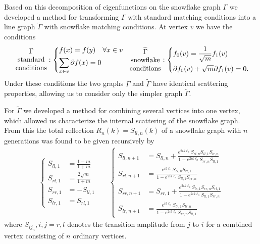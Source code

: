 Based on this decomposition of eigenfunctions on the snowflake graph $\Gamma$ we developed a  method for transforming $\Gamma$ with standard matching conditions into a line graph $\widetilde{\Gamma}$ with snowflake matching conditions. At vertex $v$ we have the conditions
\begin{align*}
  \!\begin{array}{c}
    \Gamma \\
    \text{standard} \\
    \text{conditions}
  \end{array}\!\!\!:
  \begin{dcases}
    f(x) = f(y) \quad \forall x \in v \\
    \sum_{x\in v}  \partial f(x) = 0
  \end{dcases}
  &&
  \!\!\!\!\begin{array}{c}
    \widetilde{\Gamma} \\
    \text{snowflake} \\
    \text{conditions}
  \end{array}\!\!\!:
  \begin{dcases}
    f_0(v) = \frac{1}{\sqrt{m}} f_1(v) \\
    \partial f_0(v) + \sqrt{m} \partial f_1(v) = 0.
  \end{dcases}
\end{align*}
Under these conditions the two graphs $\Gamma$ and $\widetilde{\Gamma}$ have identical scattering properties, allowing us to consider only the simpler graph $\widetilde{\Gamma}$.

For $\widetilde{\Gamma}$ we developed a method for combining several vertices into one vertex, which allowed us characterize the internal scattering of the snowflake graph. From this the total reflection $R_n(k) = S_{ll,n}(k)$ of a snowflake graph with $n$ generations was found to be given recursively by
\begin{align*}
  \left\lbrace\!
  \begin{aligned}
    S_{ll,1} &= \frac{1-m}{1+m} \\
    S_{rl,1} &= \frac{2\sqrt{m}}{1+m} \\
    S_{rr,1} &= -S_{ll,1} \\
    S_{lr,1} &= S_{rl,1}
  \end{aligned}\right.
  &&
  \left\lbrace\!
  \begin{aligned}
    S_{ll,n+1} &= S_{ll,n} + \frac{e^{2ik\ell_n} S_{rl,n} S_{ll,1} S_{lr,n}}{1 - e^{2ik\ell_n} S_{rr,n} S_{ll,1}} \\
    S_{rl,n+1} &= \frac{e^{ik\ell_n} S_{rl,n} S_{rl,1}}{1 - e^{2ik\ell_n} S_{ll,1} S_{rr,n}} \\
    S_{rr,n+1} &= S_{rr,1} + \frac{e^{2ik\ell_n} S_{lr,1} S_{rr,n} S_{rl,1}}{1 - e^{2ik\ell_n} S_{ll,1} S_{rr,n}} \\
    S_{lr,n+1} &= \frac{e^{ik\ell_n} S_{lr,1}S_{lr,n}}{1 - e^{2ik\ell_n} S_{rr,n} S_{ll,1}}
  \end{aligned}\right.
\end{align*}
where $S_{ij_n}, i,j=r,l$ denotes the transition amplitude from $j$ to $i$ for a combined vertex consisting of $n$ ordinary vertices.

